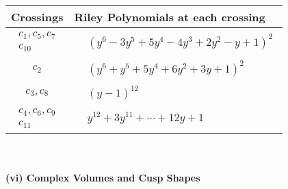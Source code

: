 \documentclass[1p]{elsarticle_modified}
\theoremstyle{definition}
\begin{document}
\begin{tabular}{m{50pt}|m{274pt}}
Crossings & \hspace{64pt}Riley Polynomials at each crossing \\
\hline $$\begin{aligned}c_{1},c_{5},c_{7}\\c_{10}\end{aligned}$$&$\begin{aligned}
&(y^6-3 y^5+5 y^4-4 y^3+2 y^2- y+1)^2
\end{aligned}$\\
\hline $$\begin{aligned}c_{2}\end{aligned}$$&$\begin{aligned}
&(y^6+y^5+5 y^4+6 y^2+3 y+1)^2
\end{aligned}$\\
\hline $$\begin{aligned}c_{3},c_{8}\end{aligned}$$&$\begin{aligned}
&(y-1)^{12}
\end{aligned}$\\
\hline $$\begin{aligned}c_{4},c_{6},c_{9}\\c_{11}\end{aligned}$$&$\begin{aligned}
&y^{12}+3 y^{11}+\cdots+12 y+1
\end{aligned}$\\
\hline
\end{tabular}\\~\\
\newpage\flushleft \textbf{(vi) Complex Volumes and Cusp Shapes}
\end{document}

